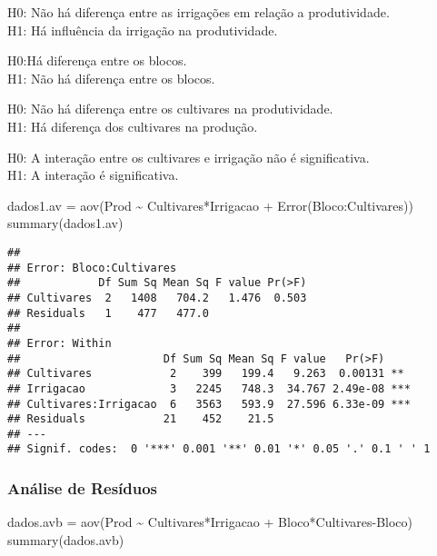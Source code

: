 \documentclass[
]{article}
\newenvironment{Shaded}{\begin{snugshade}}{\end{snugshade}}
\newcommand{\FunctionTok}[1]{\textcolor[rgb]{0.00,0.00,0.00}{#1}}
\newcommand{\NormalTok}[1]{#1}
\newcommand{\OtherTok}[1]{\textcolor[rgb]{0.56,0.35,0.01}{#1}}
\newcommand{\SpecialCharTok}[1]{\textcolor[rgb]{0.00,0.00,0.00}{#1}}
\begin{document}
H0: Não há diferença entre as irrigações em relação a produtividade.\\
H1: Há influência da irrigação na produtividade.

H0:Há diferença entre os blocos.\\
H1: Não há diferença entre os blocos.

H0: Não há diferença entre os cultivares na produtividade.\\
H1: Há diferença dos cultivares na produção.

H0: A interação entre os cultivares e irrigação não é significativa.\\
H1: A interação é significativa.

\begin{Shaded}
\begin{Highlighting}[]
\NormalTok{dados1.av }\OtherTok{=} \FunctionTok{aov}\NormalTok{(Prod }\SpecialCharTok{\textasciitilde{}}\NormalTok{  Cultivares}\SpecialCharTok{*}\NormalTok{Irrigacao }\SpecialCharTok{+} \FunctionTok{Error}\NormalTok{(Bloco}\SpecialCharTok{:}\NormalTok{Cultivares))}
\FunctionTok{summary}\NormalTok{(dados1.av)}
\end{Highlighting}
\end{Shaded}

\begin{verbatim}
## 
## Error: Bloco:Cultivares
##            Df Sum Sq Mean Sq F value Pr(>F)
## Cultivares  2   1408   704.2   1.476  0.503
## Residuals   1    477   477.0               
## 
## Error: Within
##                      Df Sum Sq Mean Sq F value   Pr(>F)    
## Cultivares            2    399   199.4   9.263  0.00131 ** 
## Irrigacao             3   2245   748.3  34.767 2.49e-08 ***
## Cultivares:Irrigacao  6   3563   593.9  27.596 6.33e-09 ***
## Residuals            21    452    21.5                     
## ---
## Signif. codes:  0 '***' 0.001 '**' 0.01 '*' 0.05 '.' 0.1 ' ' 1
\end{verbatim}

\hypertarget{anuxe1lise-de-resuxedduos}{%
\subsubsection{Análise de Resíduos}\label{anuxe1lise-de-resuxedduos}}

\begin{Shaded}
\begin{Highlighting}[]
\NormalTok{dados.avb }\OtherTok{=} \FunctionTok{aov}\NormalTok{(Prod }\SpecialCharTok{\textasciitilde{}}\NormalTok{ Cultivares}\SpecialCharTok{*}\NormalTok{Irrigacao }\SpecialCharTok{+}\NormalTok{ Bloco}\SpecialCharTok{*}\NormalTok{Cultivares}\SpecialCharTok{{-}}\NormalTok{Bloco)}
\FunctionTok{summary}\NormalTok{(dados.avb)}
\end{Highlighting}
\end{Shaded}
\end{document}
